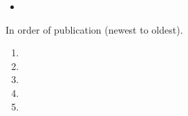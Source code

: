 \newpage
{}


  


  \begin{itemize}
  \item 
  \end{itemize}

\begin{fullwidth}
  In order of publication (newest to oldest).

  \divider


  \begin{enumerate} \normalsize
  \item  \divider
  \item  \divider
  \item  \divider
  \item  \divider
  \item 
  \end{enumerate}

  \iffalse
  \divider

  \cvsubsection{In Submission}

  \begin{itemize} \normalsize
  \item  \divider
  \end{itemize}
  \fi
\end{fullwidth}


